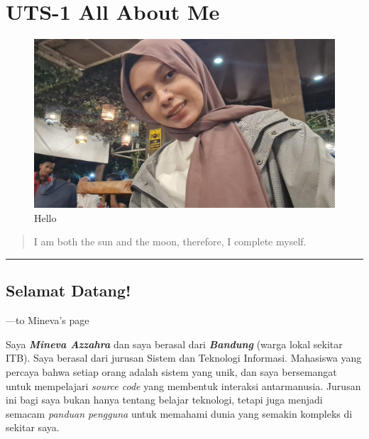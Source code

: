 \documentclass[
  letterpaper,
  DIV=11,
  numbers=noendperiod]{scrreprt}
\begin{document}

\chapter{UTS-1 All About Me}\label{uts-1-all-about-me}

\begin{figure}[H]

{\centering \includegraphics[width=1\linewidth,height=\textheight,keepaspectratio]{images/mi.jpeg}

}

\caption{Hello}

\end{figure}%

\begin{quote}
I am both the sun and the moon, therefore, I complete myself.
\end{quote}

\begin{center}\rule{0.5\linewidth}{0.5pt}\end{center}

\section{Selamat Datang!}\label{selamat-datang}

---to Mineva's page

Saya \textbf{\emph{Mineva Azzahra}} dan saya berasal dari
\textbf{\emph{Bandung}} (warga lokal sekitar ITB). Saya berasal dari
jurusan Sistem dan Teknologi Informasi. Mahasiswa yang percaya bahwa
setiap orang adalah sistem yang unik, dan saya bersemangat untuk
mempelajari \emph{source code} yang membentuk interaksi antarmanusia.
Jurusan ini bagi saya bukan hanya tentang belajar teknologi, tetapi juga
menjadi semacam \emph{panduan pengguna} untuk memahami dunia yang
semakin kompleks di sekitar saya.
\end{document}
